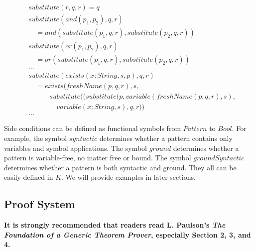 \documentclass[UTF8]{article}
\newcommand{\comment}[1]
    {\par {\bfseries \color{blue} #1 \par}} %
\theoremstyle{plain}
\theoremstyle{definition}
\theoremstyle{remark}
\newcommand{\cln}{{:}}
\begin{document}
\begin{align*}
&\mathit{substitute}(r, q, r) = q\\
&\mathit{substitute}(\mathit{and}(p_1, p_2), q, r) \\ 
&\quad = \mathit{and}(\mathit{substitute}(p_1, q, r), \mathit{substitute}(p_2, q, r))\\
&\mathit{substitute}(\mathit{or}(p_1, p_2), q, r) \\
&\quad = \mathit{or}(\mathit{substitute}(p_1, q, r), \mathit{substitute}(p_2, q, r))\\
&\dots\\
&\mathit{substitute}(\mathit{exists}(x\cln\mathit{String}, s, p), q, r)\\
&\quad = \mathit{exists}(\mathit{freshName}(p, q, r), s,\\
&\qquad \quad \mathit{substitute}((\mathit{substitute}(p, variable(\mathit{freshName}(p, q, r), s), \\
&\qquad \quad \quad variable(x\cln\mathit{String}, s), q, r))\\
&\dots
\end{align*}

Side conditions can be defined as functional symbols from $\mathit{Pattern}$ to $\mathit{Bool}$. 
For example, the symbol $\mathit{syntactic}$ determines whether a pattern contains only variables and symbol applications. 
The symbol $\mathit{ground}$ determines whether a pattern is variable-free, no matter free or bound. 
The symbol $\mathit{groundSyntactic}$ determines whether a pattern is both syntactic and ground.
They all can be easily defined in $K$.
We will provide examples in later sections. 

\subsection{Proof System}
\comment{It is strongly recommended that readers read L. Paulson's \emph{The Foundation of a Generic Theorem Prover}, especially Section 2, 3, and 4.}
\end{document}
